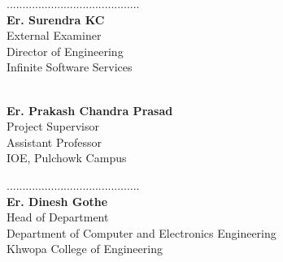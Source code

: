 \noindent
\begin{minipage}[t]{0.45\textwidth}
\centering
..........................................\\
\textbf{Er. Surendra KC} \\
External Examiner \\
Director of Engineering \\
Infinite Software Services
\end{minipage}
\hfill
\begin{minipage}[t]{0.45\textwidth}
\centering
{}\\
\textbf{Er. Prakash Chandra Prasad} \\
Project Supervisor \\
Assistant Professor \\
IOE, Pulchowk Campus
\end{minipage}

\vspace{2cm}
\begin{center}
..........................................\\
\textbf{Er. Dinesh Gothe}\\
Head of Department\\
Department of Computer and Electronics Engineering\\
Khwopa College of Engineering
\end{center}
\newpage
